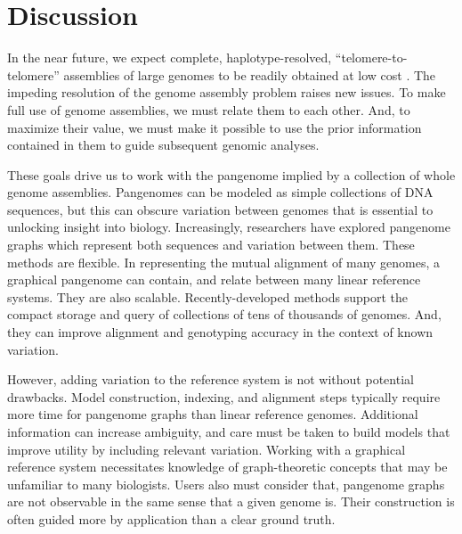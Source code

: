 \section{Discussion}
\label{sec:discussion}

In the near future, we expect complete, haplotype-resolved, ``telomere-to-telomere'' assemblies of large genomes to be readily obtained at low cost \cite{miga2019telomere}.
The impeding resolution of the genome assembly problem raises new issues.
To make full use of genome assemblies, we must relate them to each other.
And, to maximize their value, we must make it possible to use the prior information contained in them to guide subsequent genomic analyses.

These goals drive us to work with the pangenome implied by a collection of whole genome assemblies.
Pangenomes can be modeled as simple collections of DNA sequences, but this can obscure variation between genomes that is essential to unlocking insight into biology.
Increasingly, researchers have explored pangenome graphs which represent both sequences and variation between them.
These methods are flexible.
In representing the mutual alignment of many genomes, a graphical pangenome can contain, and relate between many linear reference systems.
They are also scalable.
Recently-developed methods support the compact storage and query of collections of tens of thousands of genomes. %
And, they can improve alignment and genotyping accuracy in the context of known variation.

However, adding variation to the reference system is not without potential drawbacks.
Model construction, indexing, and alignment steps typically require more time for pangenome graphs than linear reference genomes.
Additional information can increase ambiguity, and care must be taken to build models that improve utility by including relevant variation.
Working with a graphical reference system necessitates knowledge of graph-theoretic concepts that may be unfamiliar to many biologists.
Users also must consider that, pangenome graphs are not observable in the same sense that a given genome is.
Their construction is often guided more by application than a clear ground truth.

